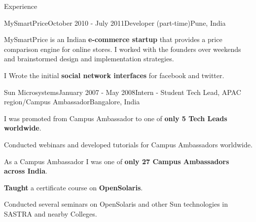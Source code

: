 \documentclass{resume} %
\begin{document}
\begin{rSection}{Experience}
\begin{rSubsection}{MySmartPrice}{October 2010 - July 2011}{Developer (part-time)}{Pune, India}
\item MySmartPrice is an Indian \textbf{e-commerce startup} that provides a price comparison engine for online stores. 
I worked with the founders over weekends and brainstormed design and implementation strategies.
\item I Wrote the initial \textbf{social network interfaces} for facebook and twitter. 
\end{rSubsection}

\begin{rSubsection}{Sun Microsystems}{January 2007 - May 2008}{Intern - Student Tech Lead, APAC region/Campus Ambassador}{Bangalore, India}
\item I was promoted from Campus Ambassador to one of \textbf{only 5 Tech Leads worldwide}.
\item Conducted webinars and developed tutorials for Campus Ambassadors worldwide.
\item As a Campus Ambassador I was one of \textbf{only 27 Campus Ambassadors across India}.
\item \textbf{Taught} a certificate course on \textbf{OpenSolaris}.
\item Conducted several seminars on OpenSolaris and other Sun technologies in SASTRA and nearby Colleges.
\end{rSubsection}
\end{rSection}
\newpage



\end{document}
